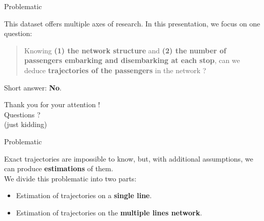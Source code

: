 \documentclass[10pt]{beamer}
\newcommand{\imp}[1]{\textbf{\color{cyan}#1}}
\begin{document}

	\begin{frame}{Problematic}
		
		This dataset offers multiple axes of research. In this presentation, we focus on one question: \\
		\vspace{0.6cm}
		\begin{quotation}
			\large
			Knowing \imp{(1) the network structure} and \imp{(2) the number of passengers embarking and disembarking at each stop}, can we deduce \imp{trajectories of the passengers} in the network ?
		\end{quotation}
		\normalsize
		\vspace{0.4cm}
		Short answer: {\large \imp{No}}.
	\end{frame}

	
	\begin{frame}

		\begin{center}
			\huge Thank you for your attention ! \\
			Questions ? \\
			\vspace{1cm}
			\small
			(just kidding)
		\end{center}
		
		
	\end{frame}
	
	
	\begin{frame}{Problematic}
		
		Exact trajectories are impossible to know, but, with additional assumptions, we can produce  \imp{estimations} of them. \\
		\vspace{0.4cm}
		We divide this problematic into two parts:
		\begin{itemize}
			\item Estimation of trajectories on a \imp{single line}.
			\item Estimation of trajectories on the \imp{multiple lines network}.
		\end{itemize}
		
	\end{frame}
	
	
\end{document}
